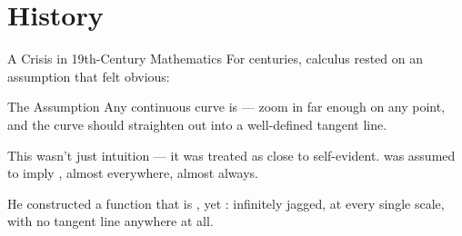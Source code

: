 



\begin{frame}
  \titlepage
\end{frame}

\section{History}

\begin{frame}{A Crisis in 19th-Century Mathematics}
  \small
  For centuries, calculus rested on an assumption that felt obvious:

  \begin{conceptbox}{The Assumption}
    Any continuous curve is  —
    zoom in far enough on any point, and the curve should straighten
    out into a well-defined tangent line.
  \end{conceptbox}

  \pause
  \vspace{0.3cm}
  This wasn't just intuition — it was treated as close to self-evident.
   was assumed to imply ,
  almost everywhere, almost always.

  \pause
  \vspace{0.3cm}
  \begin{center}
  \end{center}

  \pause
  \vspace{0.2cm}
  He constructed a function that is ,
  yet : infinitely jagged, at every
  single scale, with no tangent line anywhere at all.
\end{frame}

